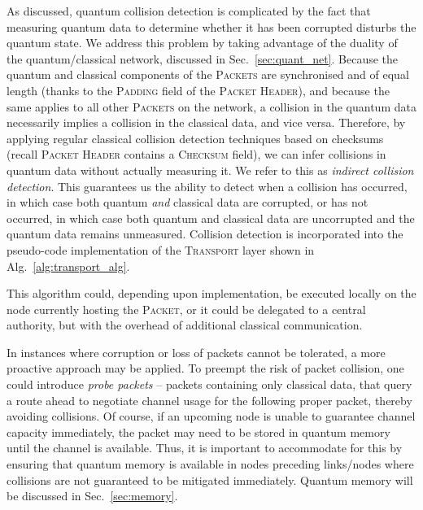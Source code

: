 \documentclass[aps, rmp, twocolumn, amsmath, amssymb, nofootinbib, superscriptaddress, longbibliography, floatfix, table-of-contents, eqsecnum]{revtex4-1}
\begin{document}
As discussed, quantum collision detection is complicated by the fact that measuring quantum data to determine whether it has been corrupted disturbs the quantum state. We address this problem by taking advantage of the duality of the quantum/classical network, discussed in Sec.~\ref{sec:quant_net}. Because the quantum and classical components of the \textsc{Packets} are synchronised and of equal length (thanks to the \textsc{Padding} field of the \textsc{Packet Header}), and because the same applies to all other \textsc{Packets} on the network, a collision in the quantum data necessarily implies a collision in the classical data, and vice versa. Therefore, by applying regular classical collision detection techniques based on checksums (recall \textsc{Packet Header} contains a \textsc{Checksum} field), we can infer collisions in quantum data without actually measuring it. We refer to this as \textit{indirect collision detection}. This guarantees us the ability to detect when a collision has occurred, in which case both quantum \textit{and} classical data are corrupted, or has not occurred, in which case both quantum and classical data are uncorrupted and the quantum data remains unmeasured. Collision detection is incorporated into the pseudo-code implementation of the \textsc{Transport} layer shown in Alg.~\ref{alg:transport_alg}.

This algorithm could, depending upon implementation, be executed locally on the node currently hosting the \textsc{Packet}, or it could be delegated to a central authority, but with the overhead of additional classical communication.

In instances where corruption or loss of packets cannot be tolerated, a more proactive approach may be applied. To preempt the risk of packet collision, one could introduce \textit{probe packets} -- packets containing only classical data, that query a route ahead to negotiate channel usage for the following proper packet, thereby avoiding collisions. Of course, if an upcoming node is unable to guarantee channel capacity immediately, the packet may need to be stored in quantum memory until the channel is available. Thus, it is important to accommodate for this by ensuring that quantum memory is available in nodes preceding links/nodes where collisions are not guaranteed to be mitigated immediately. Quantum memory will be discussed in Sec.~\ref{sec:memory}.

%
%
\end{document}
